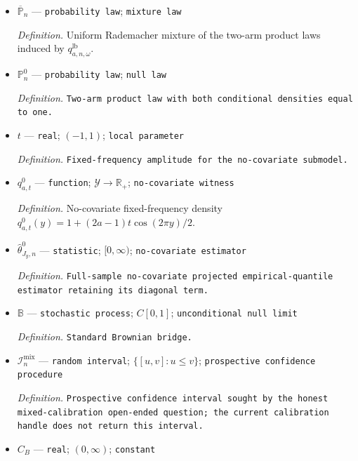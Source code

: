 \documentclass{article}
\begin{document}
\begin{itemize}
  \par\smallskip\noindent\emph{Definition.} Lower-bound conditional densities \(q_{a,n,\omega}^{\mathrm{lb}}(y,z)=1+(2a-1)b_{n,\omega}(z)\cos(2\pi y)/2\).
  \item \(\overline{\mathbb P}_n\) --- \texttt{probability law}; \texttt{mixture law}
  \par\smallskip\noindent\emph{Definition.} Uniform Rademacher mixture of the two-arm product laws induced by \(q_{a,n,\omega}^{\mathrm{lb}}\).
  \item \(\mathbb P_n^0\) --- \texttt{probability law}; \texttt{null law}
  \par\smallskip\noindent\emph{Definition.} \texttt{Two-\allowbreak{}arm product law with both conditional densities equal to one.}
  \item \(t\) --- \texttt{real}; \((-1,1)\); \texttt{local parameter}
  \par\smallskip\noindent\emph{Definition.} \texttt{Fixed-\allowbreak{}frequency amplitude for the no-\allowbreak{}covariate submodel.}
  \item \(q_{a,t}^{0}\) --- \texttt{function}; \(\mathcal Y\to\mathbb R_+\); \texttt{no-\allowbreak{}covariate witness}
  \par\smallskip\noindent\emph{Definition.} No-covariate fixed-frequency density \(q_{a,t}^{0}(y)=1+(2a-1)t\cos(2\pi y)/2\).
  \item \(\widehat\theta^0_{J_y,n}\) --- \texttt{statistic}; \([0,\infty)\); \texttt{no-\allowbreak{}covariate estimator}
  \par\smallskip\noindent\emph{Definition.} \texttt{Full-\allowbreak{}sample no-\allowbreak{}covariate projected empirical-\allowbreak{}quantile estimator retaining its diagonal term.}
  \item \(\mathbb B\) --- \texttt{stochastic process}; \(C[0,1]\); \texttt{unconditional null limit}
  \par\smallskip\noindent\emph{Definition.} \texttt{Standard Brownian bridge.}
  \item \(\mathcal I_n^{\mathrm{mix}}\) --- \texttt{random interval}; \(\{[u,v]:u\le v\}\); \texttt{prospective confidence procedure}
  \par\smallskip\noindent\emph{Definition.} \texttt{Prospective confidence interval sought by the honest mixed-\allowbreak{}calibration open-\allowbreak{}ended question;\allowbreak{} the current calibration handle does not return this interval.}
  \item \(C_B\) --- \texttt{real}; \((0,\infty)\); \texttt{constant}

\end{itemize}
\end{document}
